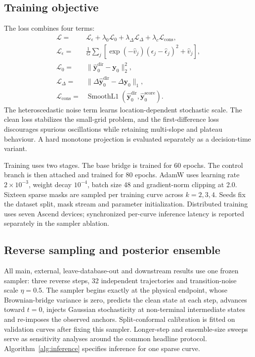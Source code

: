 \documentclass[a4paper,fleqn]{cas-dc}
\newcommand{\vect}[1]{\boldsymbol{#1}}
\begin{document}
\subsection{Training objective}

The loss combines four terms:
\begin{align}
 \mathcal{L}={}&\mathcal{L}_{\epsilon}
 +\lambda_0\mathcal{L}_{0}
 +\lambda_{\Delta}\mathcal{L}_{\Delta}
 +\lambda_{c}\mathcal{L}_{\mathrm{cons}},\\
 \mathcal{L}_{\epsilon}={}&\frac{1}{G}\sum_j
 \left[\exp(-\hat v_j)(\epsilon_j-\hat\epsilon_j)^2+\hat v_j\right],\\
 \mathcal{L}_{0}={}&\|\hat{\vect{y}}_0^{\mathrm{dir}}-\vect{y}_0\|_2^2,\\
 \mathcal{L}_{\Delta}={}&\|\Delta\hat{\vect{y}}_0^{\mathrm{dir}}-\Delta\vect{y}_0\|_1,\\
 \mathcal{L}_{\mathrm{cons}}={}&\operatorname{SmoothL1}
 (\hat{\vect{y}}_0^{\mathrm{dir}},\hat{\vect{y}}_0^{\mathrm{score}}).
 \label{eq:loss}
\end{align}
The heteroscedastic noise term learns location-dependent stochastic scale. The clean loss stabilizes the small-grid problem, and the first-difference loss discourages spurious oscillations while retaining multi-slope and plateau behaviour. A hard monotone projection is evaluated separately as a decision-time variant.

Training uses two stages. The base bridge is trained for 60 epochs. The control branch is then attached and trained for 80 epochs. AdamW uses learning rate $2\times10^{-3}$, weight decay $10^{-4}$, batch size 48 and gradient-norm clipping at 2.0. Sixteen sparse masks are sampled per training curve across $k=2,3,4$. Seeds fix the dataset split, mask stream and parameter initialization. Distributed training uses seven Ascend devices; synchronized per-curve inference latency is reported separately in the sampler ablation.

\subsection{Reverse sampling and posterior ensemble}

All main, external, leave-database-out and downstream results use one frozen sampler: three reverse steps, 32 independent trajectories and transition-noise scale $\eta=0.5$. The sampler begins exactly at the physical endpoint, whose Brownian-bridge variance is zero, predicts the clean state at each step, advances toward $t=0$, injects Gaussian stochasticity at non-terminal intermediate states and re-imposes the observed anchors. Split-conformal calibration is fitted on validation curves after fixing this sampler. Longer-step and ensemble-size sweeps serve as sensitivity analyses around the common headline protocol. Algorithm~\ref{alg:inference} specifies inference for one sparse curve.
\end{document}
